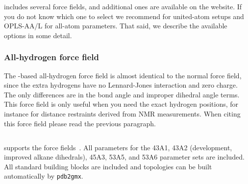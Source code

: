 {\gromacs} {\gmxver} includes several force fields, and additional
ones are available on the website. If you do not know which one to
select we recommend  for united-atom setups and OPLS-AA/L for
all-atom parameters. That said, we describe the available options in
some detail.

\subsubsection{All-hydrogen force field}
The -based all-hydrogen force field is almost identical to the
normal  force field, since the extra hydrogens have no
Lennard-Jones interaction and zero charge. The only differences are in
the bond angle and improper dihedral angle terms. This force field is
only useful when you need the exact hydrogen positions, for instance
for distance restraints derived from NMR measurements. When citing
this force field please read the previous paragraph.

\subsection{}
{\gromacs} supports the  force fields~\cite{gromos96}.
All parameters for the 43A1, 43A2 (development, improved alkane
dihedrals), 45A3, 53A5, and 53A6 parameter sets are included.  All standard
building blocks are included and topologies can be built automatically
by {\tt pdb2gmx}.  

